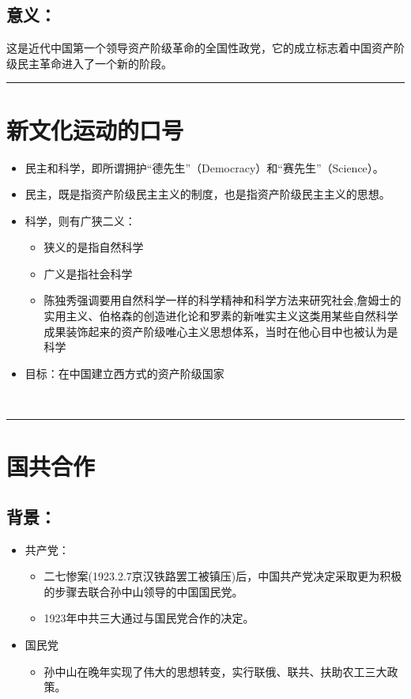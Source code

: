\documentclass{article}
\begin{document}
\subsection*{意义：}
这是近代中国第一个领导资产阶级革命的全国性政党，它的成立标志着中国资产阶级民主革命进入了一个新的阶段。
\\\hrule

\section*{新文化运动的口号}
\begin{itemize}
    \item 民主和科学，即所谓拥护``德先生''（Democracy）和``赛先生''（Science）。
     \item 民主，既是指资产阶级民主主义的制度，也是指资产阶级民主主义的思想。
     \item 科学，则有广狭二义：
     \begin{itemize}
     	\item 狭义的是指自然科学
     	\item 广义是指社会科学
     	\item 陈独秀强调要用自然科学一样的科学精神和科学方法来研究社会,詹姆士的实用主义、伯格森的创造进化论和罗素的新唯实主义这类用某些自然科学成果装饰起来的资产阶级唯心主义思想体系，当时在他心目中也被认为是科学
     
     \end{itemize}	
 \item 目标：在中国建立西方式的资产阶级国家
\end{itemize}
\ \hrule

\section*{国共合作}
\subsection*{背景：}
\begin{itemize}
	\item 共产党：
	\begin{itemize}
		 \item 二七惨案(1923.2.7京汉铁路罢工被镇压)后，中国共产党决定采取更为积极的步骤去联合孙中山领导的中国国民党。
		\item 1923年中共三大通过与国民党合作的决定。
	\end{itemize}
    \item 国民党
    \begin{itemize}
    	\item 孙中山在晚年实现了伟大的思想转变，实行联俄、联共、扶助农工三大政策。
    \end{itemize}
\end{itemize}
\end{document}
